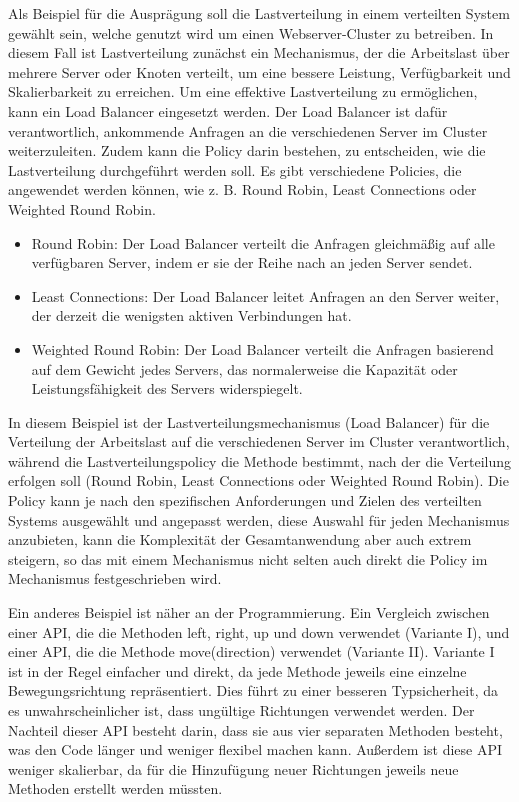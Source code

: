 Als Beispiel für die Ausprägung soll die Lastverteilung in einem verteilten System gewählt sein, welche genutzt wird um einen  Webserver-Cluster zu betreiben. In diesem Fall ist Lastverteilung zunächst ein Mechanismus, der die Arbeitslast über mehrere Server oder Knoten verteilt, um eine bessere Leistung, Verfügbarkeit und Skalierbarkeit zu erreichen. Um eine effektive Lastverteilung zu ermöglichen, kann ein Load Balancer eingesetzt werden. Der Load Balancer ist dafür verantwortlich, ankommende Anfragen an die verschiedenen Server im Cluster weiterzuleiten.
Zudem kann die Policy darin bestehen, zu entscheiden, wie die Lastverteilung durchgeführt werden soll. Es gibt verschiedene Policies, die angewendet werden können, wie z. B. Round Robin, Least Connections oder Weighted Round Robin.
\begin{itemize} 
\item Round Robin: Der Load Balancer verteilt die Anfragen gleichmäßig auf alle verfügbaren Server, indem er sie der Reihe nach an jeden Server sendet.
\item Least Connections: Der Load Balancer leitet Anfragen an den Server weiter, der derzeit die wenigsten aktiven Verbindungen hat.
\item Weighted Round Robin: Der Load Balancer verteilt die Anfragen basierend auf dem Gewicht jedes Servers, das normalerweise die Kapazität oder Leistungsfähigkeit des Servers widerspiegelt.
\end{itemize}  
In diesem Beispiel ist der Lastverteilungsmechanismus (Load Balancer) für die Verteilung der Arbeitslast auf die verschiedenen Server im Cluster verantwortlich, während die Lastverteilungspolicy die Methode bestimmt, nach der die Verteilung erfolgen soll (Round Robin, Least Connections oder Weighted Round Robin). Die Policy kann je nach den spezifischen Anforderungen und Zielen des verteilten Systems ausgewählt und angepasst werden, diese Auswahl für jeden Mechanismus anzubieten, kann die Komplexität der Gesamtanwendung aber auch extrem steigern, so das mit einem Mechanismus nicht selten auch direkt die Policy im Mechanismus festgeschrieben wird.  

Ein anderes Beispiel ist näher an der Programmierung. Ein Vergleich zwischen einer API, die die Methoden left, right, up und down verwendet (Variante I), und einer API, die die Methode move(direction) verwendet (Variante II). Variante I ist in der Regel einfacher und direkt, da jede Methode jeweils eine einzelne Bewegungsrichtung repräsentiert. Dies führt zu einer besseren Typsicherheit, da es unwahrscheinlicher ist, dass ungültige Richtungen verwendet werden. Der Nachteil dieser API besteht darin, dass sie aus vier separaten Methoden besteht, was den Code länger und weniger flexibel machen kann. Außerdem ist diese API weniger skalierbar, da für die Hinzufügung neuer Richtungen jeweils neue Methoden erstellt werden müssten.

